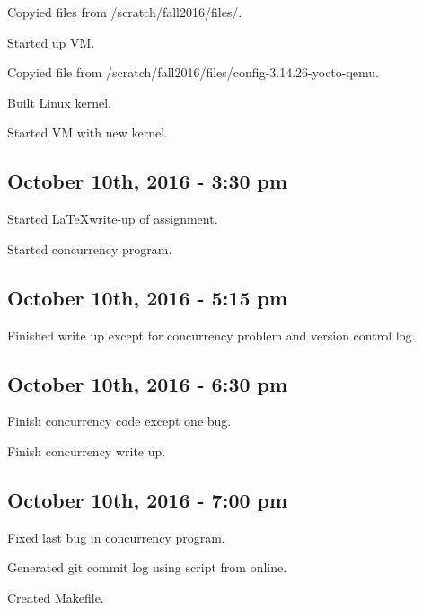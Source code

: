 \documentclass[letterpaper,10pt]{article}
\begin{document}
Copyied files from /scratch/fall2016/files/.

Started up VM.

Copyied file from /scratch/fall2016/files/config-3.14.26-yocto-qemu.

Built Linux kernel.

Started VM with new kernel.
\subsection{October 10th, 2016 - 3:30 pm}
Started \LaTeX write-up of assignment.

Started concurrency program.
\subsection{October 10th, 2016 - 5:15 pm}
Finished write up except for concurrency problem and version control log.
\subsection{October 10th, 2016 - 6:30 pm}
Finish concurrency code except one bug.

Finish concurrency write up.
\subsection{October 10th, 2016 - 7:00 pm}
Fixed last bug in concurrency program.

Generated git commit log using script from online.

Created Makefile.
\end{document}
